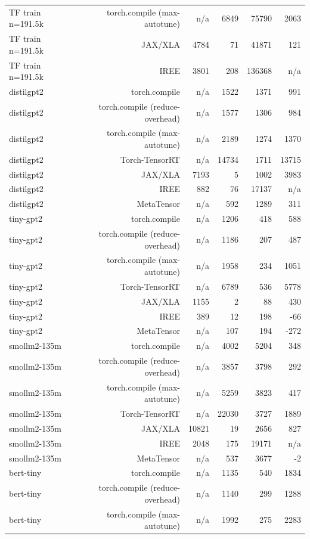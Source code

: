 \begin{tabular}{lrrrrr}
TF train n=191.5k & torch.compile (max-autotune) & n/a & 6849 & 75790 & 2063 \\
TF train n=191.5k & JAX/XLA & 4784 & 71 & 41871 & 121 \\
TF train n=191.5k & IREE & 3801 & 208 & 136368 & n/a \\
distilgpt2 & torch.compile & n/a & 1522 & 1371 & 991 \\
distilgpt2 & torch.compile (reduce-overhead) & n/a & 1577 & 1306 & 984 \\
distilgpt2 & torch.compile (max-autotune) & n/a & 2189 & 1274 & 1370 \\
distilgpt2 & Torch-TensorRT & n/a & 14734 & 1711 & 13715 \\
distilgpt2 & JAX/XLA & 7193 & 5 & 1002 & 3983 \\
distilgpt2 & IREE & 882 & 76 & 17137 & n/a \\
distilgpt2 & MetaTensor & n/a & 592 & 1289 & 311 \\
tiny-gpt2 & torch.compile & n/a & 1206 & 418 & 588 \\
tiny-gpt2 & torch.compile (reduce-overhead) & n/a & 1186 & 207 & 487 \\
tiny-gpt2 & torch.compile (max-autotune) & n/a & 1958 & 234 & 1051 \\
tiny-gpt2 & Torch-TensorRT & n/a & 6789 & 536 & 5778 \\
tiny-gpt2 & JAX/XLA & 1155 & 2 & 88 & 430 \\
tiny-gpt2 & IREE & 389 & 12 & 198 & -66 \\
tiny-gpt2 & MetaTensor & n/a & 107 & 194 & -272 \\
smollm2-135m & torch.compile & n/a & 4002 & 5204 & 348 \\
smollm2-135m & torch.compile (reduce-overhead) & n/a & 3857 & 3798 & 292 \\
smollm2-135m & torch.compile (max-autotune) & n/a & 5259 & 3823 & 417 \\
smollm2-135m & Torch-TensorRT & n/a & 22030 & 3727 & 1889 \\
smollm2-135m & JAX/XLA & 10821 & 19 & 2656 & 827 \\
smollm2-135m & IREE & 2048 & 175 & 19171 & n/a \\
smollm2-135m & MetaTensor & n/a & 537 & 3677 & -2 \\
bert-tiny & torch.compile & n/a & 1135 & 540 & 1834 \\
bert-tiny & torch.compile (reduce-overhead) & n/a & 1140 & 299 & 1288 \\
bert-tiny & torch.compile (max-autotune) & n/a & 1992 & 275 & 2283 \\

\end{tabular}

